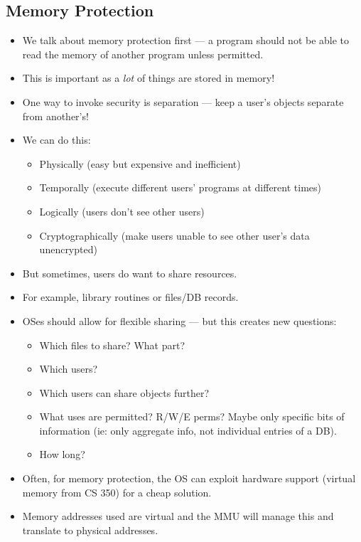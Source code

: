 \documentclass{article}
\begin{document}
\subsection{Memory Protection}
\begin{itemize}
    \item We talk about memory protection first --- a program should not be able to read the memory of another program unless permitted.
    \item This is important as a \emph{lot} of things are stored in memory!
    \item One way to invoke security is separation --- keep a user's objects separate from another's!
    \item We can do this:
        \begin{itemize}
            \item Physically (easy but expensive and inefficient)
            \item Temporally (execute different users' programs at different times)
            \item Logically (users don't see other users)
            \item Cryptographically (make users unable to see other user's data unencrypted)
        \end{itemize}
    \item But sometimes, users do want to share resources.
    \item For example, library routines or files/DB records.
    \item OSes should allow for flexible sharing --- but this creates new questions:
        \begin{itemize}
            \item Which files to share?  What part?
            \item Which users?
            \item Which users can share objects further?
            \item What uses are permitted?  R/W/E perms?  Maybe only specific bits of information (ie: only aggregate info, not individual entries of a DB).
            \item How long?
        \end{itemize}
    \item Often, for memory protection, the OS can exploit hardware support (virtual memory from CS 350) for a cheap solution.
    \item Memory addresses used are virtual and the MMU will manage this and translate to physical addresses.

\end{itemize}
\end{document}
